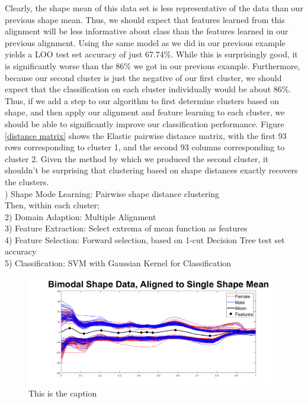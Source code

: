 \documentclass[]{article}
\begin{document}
Clearly, the shape mean of this data set is less representative of the data than our previous shape mean. Thus, we should expect that features learned from this alignment will be less informative about class than the features learned in our previous alignment. Using the same model as we did in our previous example yields a LOO test set accuracy of just 67.74\%. While this is surprisingly good, it is significantly worse than the 86\% we got in our previous example. Furthermore, because our second cluster is just the negative of our first cluster, we should expect that the classification on each cluster individually would be about 86\%. Thus, if we add a step to our algorithm to first determine clusters based on shape, and then apply our alignment and feature learning to each cluster, we should be able to significantly improve our classification performance. Figure \ref{distance matrix} shows the Elastic pairwise distance matrix, with the first 93 rows corresponding to cluster 1, and the second 93 columns corresponding to cluster 2. Given the method by which we produced the second cluster, it shouldn't be surprising that clustering based on shape distances exactly recovers the clusters. \\

) Shape Mode Learning: Pairwise shape distance clustering\\
Then, within each cluster;\\
2) Domain Adaption: Multiple Alignment\\
3) Feature Extraction: Select extrema of mean function as features\\
4) Feature Selection: Forward selection, based on 1-cut Decision Tree test set accuracy\\
5) Classification: SVM with Gaussian Kernel for Classification\\

\begin{figure}
	\includegraphics[width = \linewidth]{./Aligned_2_cluster.png}
	\caption{This is the caption}
	\label{aligned function2}
\end{figure}
\end{document}
